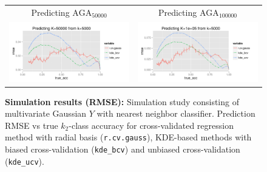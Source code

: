 \documentclass[twoside,11pt]{article}
\newenvironment{myfont}{\fontfamily{phv}\selectfont}{\par}
\begin{document}
\begin{figure}
\begin{tabular}{cc}
\begin{myfont}Predicting $\text{AGA}_{50000}$\end{myfont} &
\begin{myfont}Predicting $\text{AGA}_{100000}$\end{myfont}\\
\includegraphics[scale = 0.55, clip = true, trim = 0 0 1.25in 0.45in]{sim_large7_K50_k5.png} &
\includegraphics[scale = 0.55, clip = true, trim = 0 0 0 0.45in]{sim_large7_K100_k5.png}\\ 
\end{tabular}
\caption{\textbf{Simulation results (RMSE):} Simulation study consisting of
  multivariate Gaussian $Y$ with nearest neighbor classifier.
  Prediction RMSE vs true $k_2$-class accuracy for cross-validated regression method with radial basis
  ({\tt r.cv.gauss}), KDE-based methods with biased cross-validation
  ({\tt kde\_bcv}) and unbiased cross-validation ({\tt kde\_ucv}).}
\label{fig:sim_study}
\end{figure}
\end{document}
